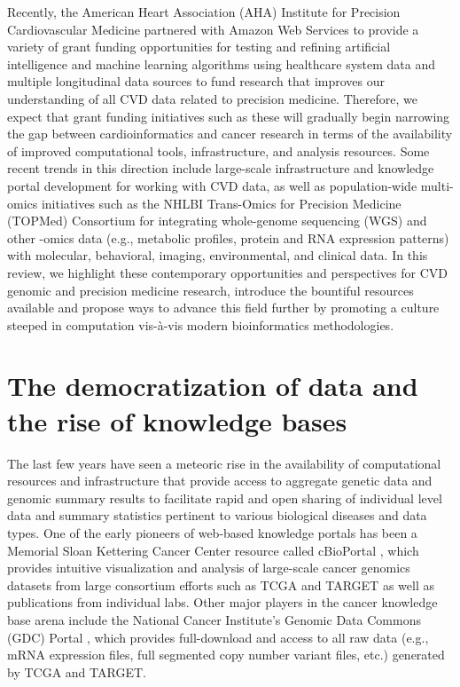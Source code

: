 \documentclass[letter]{bioinfo}
\begin{document}
Recently, the American Heart Association (AHA) Institute for Precision Cardiovascular Medicine partnered with Amazon Web Services to provide a variety of grant funding opportunities for testing and refining artificial intelligence and machine learning algorithms using healthcare system data and multiple longitudinal data sources to fund research that improves our understanding of all CVD data related to precision medicine.  Therefore, we expect that grant funding initiatives such as these will gradually begin narrowing the gap between cardioinformatics and cancer research in terms of the availability of improved computational tools, infrastructure, and analysis resources.  Some recent trends in this direction include large-scale infrastructure and knowledge portal development \citep{Kass-Hout:2018:American, Khomtchouk:2018:HeartBioPortal, Broad:NA:Cardiovascular, Broad:NA:Cerebrovascular} for working with CVD data, as well as population-wide multi-omics initiatives such as the NHLBI Trans-Omics for Precision Medicine (TOPMed) Consortium \citep{NHLBI:2014:TransOmics} for integrating whole-genome sequencing (WGS) and other -omics data (e.g., metabolic profiles, protein and RNA expression patterns) with molecular, behavioral, imaging, environmental, and clinical data.  In this review, we highlight these contemporary opportunities and perspectives for CVD genomic and precision medicine research, introduce the bountiful resources available and propose ways to advance this field further by promoting a culture steeped in computation vis-\`{a}-vis modern bioinformatics methodologies.


\section*{The democratization of data and the rise of knowledge bases}

The last few years have seen a meteoric rise in the availability of computational resources and infrastructure that provide access to aggregate genetic data and genomic summary results to facilitate rapid and open sharing of individual level data and summary statistics pertinent to various biological diseases and data types.  One of the early pioneers of web-based knowledge portals has been a Memorial Sloan Kettering Cancer Center resource called cBioPortal \citep{Cerami:2012:cBio,Gao:2013:Integrative}, which provides intuitive visualization and analysis of large-scale cancer genomics datasets from large consortium efforts such as TCGA \citep{TCGA:2013:Cancer} and TARGET \citep{Koscielny:2017:Open} as well as publications from individual labs.  Other major players in the cancer knowledge base arena include the National Cancer Institute's Genomic Data Commons (GDC) Portal \citep{Grossman:2016:Shared,Jensen:2017:NCI}, which provides full-download and access to all raw data (e.g., mRNA expression files, full segmented copy number variant files, etc.) generated by TCGA and TARGET.
	
\end{document}
